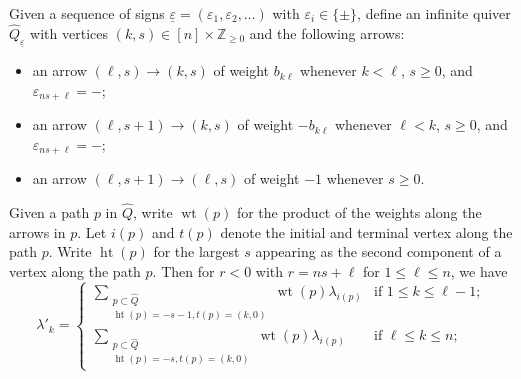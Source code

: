 \documentclass{amsart}
\numberwithin{theorem}{section}
\newcommand{\ZZ}{\mathbb{Z}}
\newcommand{\hgt}{\operatorname{ht}}
\newcommand{\uleps}{{\underline{\varepsilon}}}
\newcommand{\wt}{{\operatorname{wt}}}
\begin{document}
  Given a sequence of signs $\uleps=(\varepsilon_1,\varepsilon_2,\ldots)$ with $\varepsilon_i\in\{\pm\}$, define an infinite quiver $\widehat{Q}_\uleps$ with vertices $(k,s)\in [n]\times\ZZ_{\ge0}$ and the following arrows:
  \begin{itemize}
    \item an arrow $(\ell,s)\to (k,s)$ of weight $b_{k\ell}$ whenever $k<\ell$, $s\ge0$, and $\varepsilon_{ns+\ell}=-$;
    \item an arrow $(\ell,s+1)\to (k,s)$ of weight $-b_{k\ell}$ whenever $\ell<k$, $s\ge0$, and $\varepsilon_{ns+\ell}=-$;
    \item an arrow $(\ell,s+1)\to (\ell,s)$ of weight $-1$ whenever $s\ge0$.
  \end{itemize}
  Given a path $p$ in $\widehat{Q}$, write $\wt(p)$ for the product of the weights along the arrows in $p$.
  Let $i(p)$ and $t(p)$ denote the initial and terminal vertex along the path $p$.
  Write $\hgt(p)$ for the largest $s$ appearing as the second component of a vertex along the path $p$.
  Then for $r<0$ with $r=ns+\ell$ for $1\le\ell\le n$, we have
  \[\lambda'_k=\begin{cases}\sum\limits_{\substack{p\subset\widehat{Q}\\ \hgt(p)=-s-1, t(p)=(k,0)}}\wt(p)\lambda_{i(p)} & \text{if $1\le k\le\ell-1$;}\\ \sum\limits_{\substack{p\subset\widehat{Q}\\ \hgt(p)=-s, t(p)=(k,0)}}\wt(p)\lambda_{i(p)} & \text{if $\ell\le k\le n$;} \end{cases}\]


  
\end{document}
